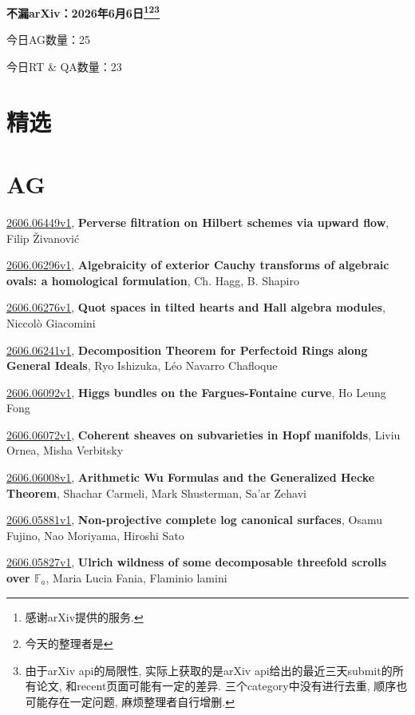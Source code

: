 \documentclass[9pt, a4paper]{article}
\theoremstyle{plain}
\theoremstyle{definition}
\theoremstyle{remark}
\newcommand{\arxiv}[3]{\href{https://arxiv.org/abs/#1}{#1}, \textbf{\textcolor{arxivblue}{#2}}, #3}
\newcommand{\AGnumber}{25}
\newcommand{\RTQAnumber}{23}
\newcommand{\NewestDate}{2026年6月6日}
\newcommand{\todayarXiver}{} %
\begin{document}
\begin{center}
    \Huge\textbf{不漏arXiv：\NewestDate\footnote{感谢arXiv提供的服务.}\footnote{今天的整理者是\todayarXiver}\footnote{由于arXiv api的局限性, 实际上获取的是arXiv api给出的最近三天submit的所有论文, 和recent页面可能有一定的差异. 三个category中没有进行去重, 顺序也可能存在一定问题, 麻烦整理者自行增删.}} \\
\end{center}

\setcounter{section}{-1}

\begin{center}
    今日AG数量：\AGnumber
    
    今日RT \& QA数量：\RTQAnumber
    
\end{center}


\section{精选}


\section{AG}
\arxiv{2606.06449v1}{Perverse filtration on Hilbert schemes via upward flow}{Filip Živanović}

\arxiv{2606.06296v1}{Algebraicity of exterior Cauchy transforms of algebraic ovals: a homological formulation}{Ch. Hagg, B. Shapiro}

\arxiv{2606.06276v1}{Quot spaces in tilted hearts and Hall algebra modules}{Niccolò Giacomini}

\arxiv{2606.06241v1}{Decomposition Theorem for Perfectoid Rings along General Ideals}{Ryo Ishizuka, Léo Navarro Chafloque}

\arxiv{2606.06092v1}{Higgs bundles on the Fargues-Fontaine curve}{Ho Leung Fong}

\arxiv{2606.06072v1}{Coherent sheaves on subvarieties in Hopf manifolds}{Liviu Ornea, Misha Verbitsky}

\arxiv{2606.06008v1}{Arithmetic Wu Formulas and the Generalized Hecke Theorem}{Shachar Carmeli, Mark Shusterman, Sa'ar Zehavi}

\arxiv{2606.05881v1}{Non-projective complete log canonical surfaces}{Osamu Fujino, Nao Moriyama, Hiroshi Sato}

\arxiv{2606.05827v1}{Ulrich wildness of some decomposable threefold scrolls over $\mathbb F_a$}{Maria Lucia Fania, Flaminio lamini}
\end{document}

